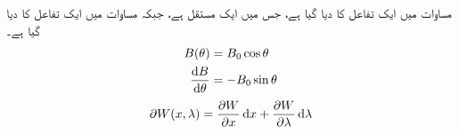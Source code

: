 %
مساوات  میں ایک تفاعل  کا  دیا گیا ہے، جس میں  ایک مستقل ہے، جبکہ مساوات   میں ایک تفاعل کا   دیا گیا ہے۔
\begin{gather}
\begin{aligned}\label{مساوات_بنیادی_تفرق}
B (\theta )&=B_0 \cos \theta\\
\frac{\dif B}{\dif \theta}&=-B_0 \sin \theta
\end{aligned}
\end{gather} 
%
\begin{align}\label{مساوات_بنیادی_جزوی_تفرق}
\partial W(x,\lambda)=\frac{\partial W}{\partial x} \dif x+\frac{\partial W}{\partial \lambda} \dif \lambda
\end{align}


